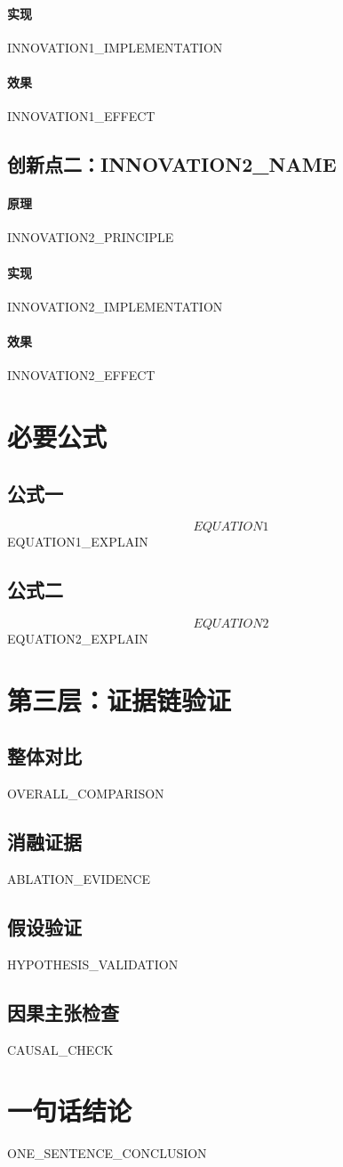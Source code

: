 \documentclass[11pt]{ctexart}
\begin{document}
\paragraph{实现}
{{INNOVATION1_IMPLEMENTATION}}
\paragraph{效果}
{{INNOVATION1_EFFECT}}

\subsection{创新点二：{{INNOVATION2_NAME}}}
\paragraph{原理}
{{INNOVATION2_PRINCIPLE}}
\paragraph{实现}
{{INNOVATION2_IMPLEMENTATION}}
\paragraph{效果}
{{INNOVATION2_EFFECT}}

\section{必要公式}
\subsection{公式一}
\begin{equation}
{{EQUATION1}}
\end{equation}
{{EQUATION1_EXPLAIN}}

\subsection{公式二}
\begin{equation}
{{EQUATION2}}
\end{equation}
{{EQUATION2_EXPLAIN}}

\section{第三层：证据链验证}
\subsection{整体对比}
{{OVERALL_COMPARISON}}

\subsection{消融证据}
{{ABLATION_EVIDENCE}}

\subsection{假设验证}
{{HYPOTHESIS_VALIDATION}}

\subsection{因果主张检查}
{{CAUSAL_CHECK}}

\section{一句话结论}
{{ONE_SENTENCE_CONCLUSION}}
\end{document}
